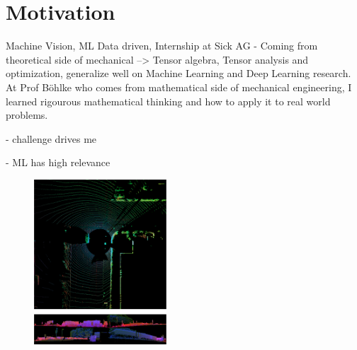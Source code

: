 


\setlength{\columnsep}{15pt}%
\setlength{\intextsep}{0pt plus 0pt minus 0pt}

\begin{minipage}[t]{504pt}
\begin{minipage}[t]{350pt}
\setlength{\parindent}{\myindent}

 \vspace*{-10pt}

\section{Motivation}
Machine Vision, ML Data driven, Internship at Sick AG
- Coming from theoretical side of mechanical --> Tensor algebra, Tensor analysis and optimization, generalize well on 
Machine Learning and Deep Learning research. At Prof Böhlke who comes from mathematical side of mechanical engineering, I learned rigourous 
mathematical thinking and how to apply it to real world problems.


- challenge drives me

- ML has high relevance
\color{red}{ELLIS, Why Ellis:
- ELLIS is a great opportunity to work with the best in the field, to learn from them and to contribute to the field.
- ELLIS is international, oppurtunities
}\color{black}
\end{minipage}
\hspace{13pt}\begin{minipage}[t]{140pt}
\begin{figure}[H]
\includegraphics[width=140pt]{pic/fusion.png}
\end{figure}
\end{minipage}
\end{minipage}



